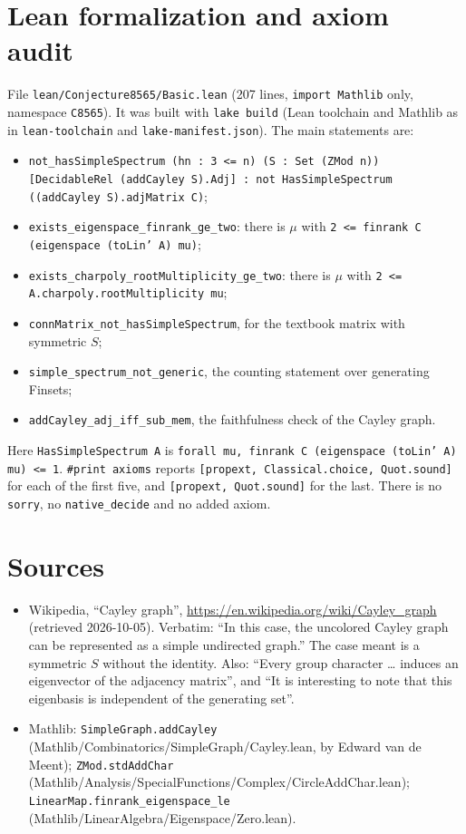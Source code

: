 \documentclass[11pt]{article}
\theoremstyle{definition}
\theoremstyle{remark}
\begin{document}
\section{Lean formalization and axiom audit}

File \texttt{lean/Conjecture8565/Basic.lean} (207 lines, \texttt{import Mathlib} only, namespace
\texttt{C8565}). It was built with \texttt{lake build} (Lean toolchain and Mathlib as in
\texttt{lean-toolchain} and \texttt{lake-manifest.json}). The main statements are:
\begin{itemize}
\item \texttt{not\_hasSimpleSpectrum (hn : 3 <= n) (S : Set (ZMod n)) [DecidableRel (addCayley S).Adj] :
  not HasSimpleSpectrum ((addCayley S).adjMatrix C)};
\item \texttt{exists\_eigenspace\_finrank\_ge\_two}: there is $\mu$ with
  \texttt{2 <= finrank C (eigenspace (toLin' A) mu)};
\item \texttt{exists\_charpoly\_rootMultiplicity\_ge\_two}: there is $\mu$ with
  \texttt{2 <= A.charpoly.rootMultiplicity mu};
\item \texttt{connMatrix\_not\_hasSimpleSpectrum}, for the textbook matrix with symmetric $S$;
\item \texttt{simple\_spectrum\_not\_generic}, the counting statement over generating Finsets;
\item \texttt{addCayley\_adj\_iff\_sub\_mem}, the faithfulness check of the Cayley graph.
\end{itemize}
Here \texttt{HasSimpleSpectrum A} is \texttt{forall mu, finrank C (eigenspace (toLin' A) mu) <= 1}.
\texttt{\#print axioms} reports \texttt{[propext, Classical.choice, Quot.sound]} for each of the
first five, and \texttt{[propext, Quot.sound]} for the last. There is no \texttt{sorry}, no
\texttt{native\_decide} and no added axiom.

\section{Sources}\label{sec:sources}

\begin{itemize}
\item Wikipedia, ``Cayley graph'', \url{https://en.wikipedia.org/wiki/Cayley_graph} (retrieved
  2026-10-05). Verbatim: ``In this case, the uncolored Cayley graph can be represented as a simple
  undirected graph.'' The case meant is a symmetric $S$ without the identity. Also: ``Every group
  character \dots{} induces an eigenvector of the adjacency matrix'', and ``It is interesting to
  note that this eigenbasis is independent of the generating set''.
\item Mathlib: \texttt{SimpleGraph.addCayley} (Mathlib/Combinatorics/SimpleGraph/Cayley.lean, by
  Edward van de Meent); \texttt{ZMod.stdAddChar} (Mathlib/Analysis/SpecialFunctions/Complex/CircleAddChar.lean);
  \texttt{LinearMap.finrank\_eigenspace\_le} (Mathlib/LinearAlgebra/Eigenspace/Zero.lean).
\end{itemize}
\end{document}
